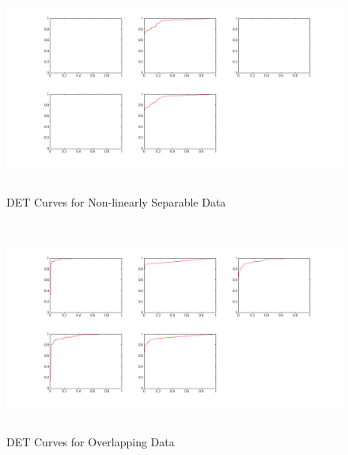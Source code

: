 \documentclass[11pt,a4paper]{article}
\begin{document}
\begin{figure}[H]
		\centering
	\includegraphics[height=7cm]{DET/2.png}
	\caption{DET Curves for Non-linearly Separable Data}
\end{figure}

\begin{figure}[H]
		\centering
	\includegraphics[height=7cm]{DET/3.png}
	\caption{DET Curves for Overlapping Data}
\end{figure}

\end{document}
